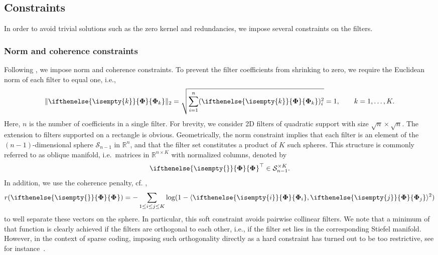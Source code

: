 \documentclass[journal]{IEEEtran}
\newcommand{\R}[1]{\mathbb{R}^{#1}}
\newcommand{\AOF}[1]{\ifthenelse{\isempty{#1}}{\boldsymbol{\Phi}}{\boldsymbol{\Phi}_{#1}}}
\begin{document}
\subsection{Constraints}

\label{subsec:constraints}


In order to avoid trivial solutions such as the zero kernel and redundancies, 
we impose several constraints on the filters.

\subsubsection{Norm and coherence constraints} \label{sec:norm_coherence_constraints}

Following \cite{hawe2013}, we impose norm and coherence constraints. 
To prevent the filter coefficients from shrinking to zero,
we require the Euclidean norm of each filter to equal one, i.e.,
\begin{equation} \label{eq:filter_norm_constraint}
\Vert \AOF{k} \Vert_2 = \sqrt{\sum_{i=1}^n (\AOF{k})_{i}^2} = 1, \qquad k=1,\dots,K.
\end{equation}
Here, $n$ is the number of coefficients in a single filter. For brevity,
we consider 2D filters of quadratic support with size $\sqrt{n}\times\sqrt{n}.$ 
The extension to filters supported on a rectangle is obvious.
Geometrically, the norm constraint implies that each filter is an element of  the $(n-1)$-dimensional sphere $\mathcal{S}_{n-1}$ in $\R{n}$, and that the filter set constitutes a product of $K$ such spheres. This structure is commonly referred to as oblique manifold, i.e.\ matrices in $\R{n \times K}$ with normalized columns, denoted by
\[
\AOF{}^{\top} \in \mathcal{S}_{n-1}^{\times K}.
\]
In addition, we use the coherence penalty, cf. \cite{hawe2013},
\begin{equation} \label{eq:incoherence_penalty}
r(\AOF{}) = - \sum_{1\leq i \leq j \leq K} \log (1 - \langle\AOF{i},\AOF{j}\rangle^2 )
\end{equation}
to well separate these vectors on the sphere.
In particular, this soft constraint avoids pairwise collinear filters. 
We note that a minimum of that function is clearly achieved if the filters are orthogonal to each other, i.e., if the filter set lies in the corresponding Stiefel manifold. However, in the context of sparse coding, imposing such orthogonality directly as a hard constraint has turned out to be too restrictive, see for instance\ \cite{hawe2013,kiechle2015}.
\end{document}
